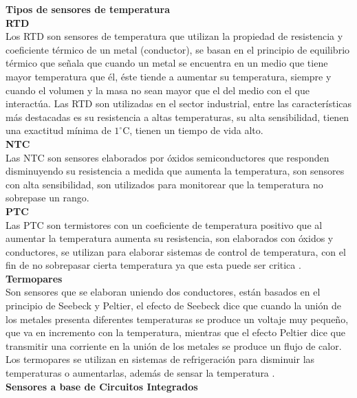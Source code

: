 \textbf{Tipos de sensores de temperatura} \\

\textbf{RTD} \\

Los RTD son sensores de temperatura que utilizan la propiedad de resistencia y coeficiente térmico de un metal (conductor), se basan en el principio de equilibrio térmico que señala que cuando un metal se encuentra en un medio que tiene mayor temperatura que él, éste tiende a aumentar su temperatura, siempre y cuando el volumen y la masa no sean mayor que el del medio con el que interactúa. Las RTD son utilizadas en el sector industrial, entre las características más destacadas es su resistencia a altas temperaturas, su alta sensibilidad, tienen una exactitud mínima de $1^{\circ}$C, tienen un tiempo de vida alto. \\

\textbf{NTC} \\

Las NTC son sensores elaborados por óxidos semiconductores que responden disminuyendo su resistencia a medida que aumenta la temperatura, son sensores con alta sensibilidad, son utilizados para monitorear que la temperatura no sobrepase un rango. \\

\textbf{PTC} \\

Las PTC son termistores con un coeficiente de temperatura positivo que al aumentar la temperatura aumenta su resistencia, son elaborados con óxidos y conductores, se utilizan para elaborar sistemas de control de temperatura, con el fin de no sobrepasar cierta temperatura ya que esta puede ser critica \cite{diecisiete}. \\

\textbf{Termopares} \\

Son sensores que se elaboran uniendo dos conductores, están basados en el principio de Seebeck y Peltier, el efecto de Seebeck dice que cuando la unión de los metales presenta diferentes temperaturas se produce un voltaje muy pequeño, que va en incremento con la temperatura, mientras que el efecto Peltier dice que transmitir una corriente en la unión de los metales se produce un flujo de calor. Los termopares se utilizan en sistemas de refrigeración para disminuir las temperaturas o aumentarlas, además de sensar la temperatura \cite{dieciocho}. \\

\textbf{Sensores a base de Circuitos Integrados} \\

